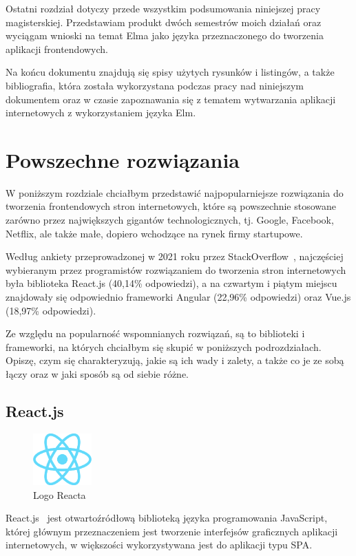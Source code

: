 \documentclass[twoside,a4paper]{report}
\begin{document}
Ostatni rozdział dotyczy przede wszystkim podsumowania niniejszej pracy magisterskiej.
Przedstawiam produkt dwóch semestrów moich działań oraz wyciągam wnioski na temat Elma jako języka przeznaczonego do tworzenia aplikacji frontendowych.

Na końcu dokumentu znajdują się spisy użytych rysunków i listingów, a także bibliografia, która została wykorzystana podczas pracy nad niniejszym dokumentem oraz w czasie zapoznawania się z tematem wytwarzania aplikacji internetowych z wykorzystaniem języka Elm.


\chapter{Powszechne rozwiązania}
W poniższym rozdziale chciałbym przedstawić najpopularniejsze rozwiązania do tworzenia frontendowych stron internetowych, które są powszechnie stosowane zarówno przez największych gigantów technologicznych, tj. Google, Facebook, Netflix, ale także małe, dopiero wchodzące na rynek firmy startupowe.

Według ankiety przeprowadzonej w 2021 roku przez StackOverflow~\cite{stacksurvey}, najczęściej wybieranym przez programistów rozwiązaniem do tworzenia stron internetowych była biblioteka React.js (40,14\% odpowiedzi), a na czwartym i piątym miejscu znajdowały się odpowiednio frameworki Angular (22,96\% odpowiedzi) oraz Vue.js (18,97\% odpowiedzi).

Ze względu na popularność wspomnianych rozwiązań, są to biblioteki i frameworki, na których chciałbym się skupić w poniższych podrozdziałach.
Opiszę, czym się charakteryzują, jakie są ich wady i zalety, a także co je ze sobą łączy oraz w jaki sposób są od siebie różne.

\section{React.js}
\begin{figure}
    \centering
    \includegraphics[width=0.2\textwidth]{img/logo_react.png}
    \caption*{Logo Reacta}\label{fig:logo_react}
\end{figure}
React.js~\cite{react} jest otwartoźródłową biblioteką języka programowania JavaScript, której głównym przeznaczeniem jest tworzenie interfejsów graficznych aplikacji internetowych, w większości wykorzystywana jest do aplikacji typu SPA\@.
\end{document}
